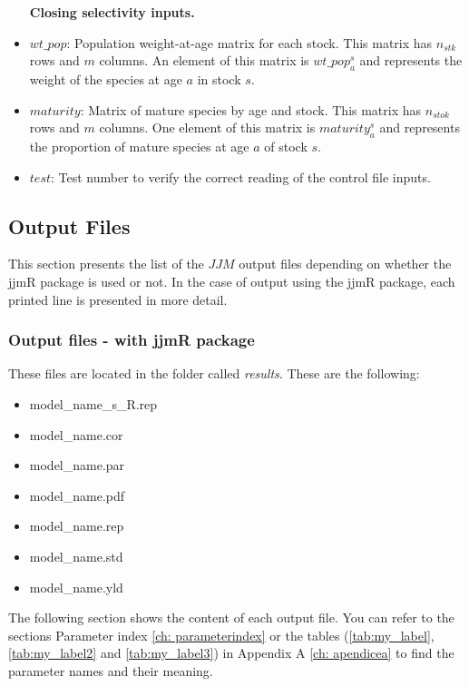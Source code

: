 \documentclass{article}
\begin{document}
\begin{itemize}
    \textbf{Closing selectivity inputs.}
    \item $wt\_pop$: Population weight-at-age matrix for each stock. This matrix has $n_{stk}$ rows and $m$ columns. An element of this matrix is $wt\_pop^s_a$ and represents the weight of the species at age $a$ in stock $s$.
    \item $maturity$: Matrix of mature species by age and stock. This matrix has $n_{stok}$ rows and $m$ columns. One element of this matrix is $maturity^s_a$ and represents the proportion of mature species at age $a$ of stock $s$.
    \item $test$: Test number to verify the correct reading of the control file inputs.
    
 


    
\end{itemize}


\subsection{Output Files}
This section presents the list of the $JJM$ output files depending on whether the jjmR package is used or not. In the case of output using the jjmR package, each printed line is presented in more detail.
\subsubsection{Output files - with jjmR package}
These files are located in the folder called \textit{results}. These are the following: 
\begin{itemize}
\item model\_name\_s\_R.rep 
\item model\_name.cor 
\item model\_name.par 
\item model\_name.pdf 
\item model\_name.rep 
\item model\_name.std
\item model\_name.yld  
\end{itemize}

The following section shows the content of each output file. You can refer to the sections Parameter index \ref{ch: parameterindex} or the tables (\ref{tab:my_label}, \ref{tab:my_label2} and \ref{tab:my_label3}) in Appendix A \ref{ch: apendicea} to find the parameter names and their meaning.
    
\end{document}

